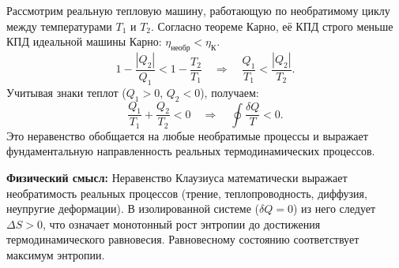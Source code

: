 \begin{property}
Рассмотрим реальную тепловую машину, работающую по необратимому циклу между температурами $T_1$ и $T_2$. Согласно теореме Карно, её КПД строго меньше КПД идеальной машины Карно: $\eta_{\text{необр}} < \eta_{\text{К}}$.
\begin{equation}
    1 - \frac{|Q_2|}{Q_1} < 1 - \frac{T_2}{T_1} \quad \Rightarrow \quad \frac{Q_1}{T_1} < \frac{|Q_2|}{T_2}.
\end{equation}
Учитывая знаки теплот ($Q_1 > 0$, $Q_2 < 0$), получаем:
\begin{equation}
    \frac{Q_1}{T_1} + \frac{Q_2}{T_2} < 0 \quad \Rightarrow \quad \oint \frac{\delta Q}{T} < 0.
\end{equation}
Это неравенство обобщается на любые необратимые процессы и выражает фундаментальную направленность реальных термодинамических процессов.
\end{property}

\begin{remark}
\textbf{Физический смысл:} Неравенство Клаузиуса математически выражает необратимость реальных процессов (трение, теплопроводность, диффузия, неупругие деформации). В изолированной системе ($\delta Q = 0$) из него следует $\Delta S > 0$, что означает монотонный рост энтропии до достижения термодинамического равновесия. Равновесному состоянию соответствует максимум энтропии.
\end{remark}
